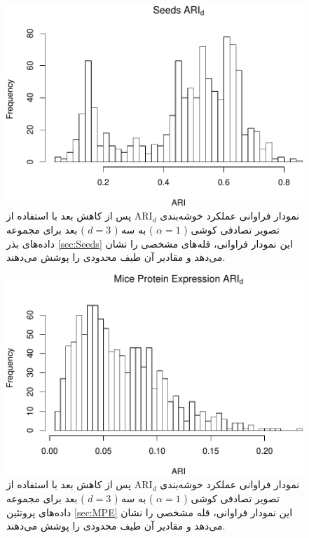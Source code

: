 \begin{figure}[H]
\centering
\includegraphics[width=0.7\linewidth]{Report_files/figure-latex/unnamed-chunk-12-5}
\caption{
نمودار فراوانی عملکرد خوشه‌بندی 
$\mathrm{ARI}_d$
پس از کاهش بعد با استفاده از تصویر تصادفی
کوشی (%
$\alpha=1$%
)
به 
سه (%
$d=3$%
)
بعد برای مجموعه داده‌های
بذر
\ref{sec:Seeds}
این نمودار فراوانی،
قله‌های
مشخصی را نشان 
می‌دهد
و مقادیر آن طیف 
محدودی
را پوشش می‌دهند.
}
\end{figure}

\begin{figure}[H]
\centering
\includegraphics[width=0.7\linewidth]{Report_files/figure-latex/unnamed-chunk-12-6}
\caption{
نمودار فراوانی عملکرد خوشه‌بندی 
$\mathrm{ARI}_d$
پس از کاهش بعد با استفاده از تصویر تصادفی
کوشی (%
$\alpha=1$%
)
به
سه (%
$d=3$%
)
بعد برای مجموعه داده‌های
پروتئین
\ref{sec:MPE}
این نمودار فراوانی،
قله
مشخصی را نشان 
می‌دهد
و مقادیر آن طیف 
محدودی
 را پوشش می‌دهند.
}
\end{figure}

